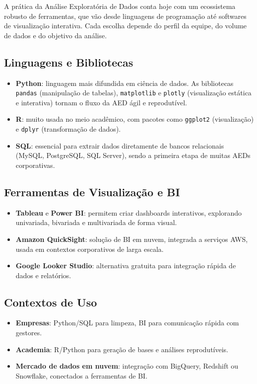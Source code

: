 A prática da Análise Exploratória de Dados conta hoje com um ecossistema robusto de ferramentas, que vão desde linguagens de programação até softwares de visualização interativa. Cada escolha depende do perfil da equipe, do volume de dados e do objetivo da análise. 

\subsection*{Linguagens e Bibliotecas}
\begin{itemize}[leftmargin=*]
  \item \textbf{Python}: linguagem mais difundida em ciência de dados. As bibliotecas \texttt{pandas} (manipulação de tabelas), \texttt{matplotlib} e \texttt{plotly} (visualização estática e interativa) tornam o fluxo da AED ágil e reprodutível.
  \item \textbf{R}: muito usada no meio acadêmico, com pacotes como \texttt{ggplot2} (visualização) e \texttt{dplyr} (transformação de dados).
  \item \textbf{SQL}: essencial para extrair dados diretamente de bancos relacionais (MySQL, PostgreSQL, SQL Server), sendo a primeira etapa de muitas AEDs corporativas.
\end{itemize}

\subsection*{Ferramentas de Visualização e BI}
\begin{itemize}[leftmargin=*]
  \item \textbf{Tableau} e \textbf{Power BI}: permitem criar dashboards interativos, explorando univariada, bivariada e multivariada de forma visual.
  \item \textbf{Amazon QuickSight}: solução de BI em nuvem, integrada a serviços AWS, usada em contextos corporativos de larga escala.
  \item \textbf{Google Looker Studio}: alternativa gratuita para integração rápida de dados e relatórios.
\end{itemize}

\subsection*{Contextos de Uso}
\begin{itemize}[leftmargin=*]
  \item \textbf{Empresas}: Python/SQL para limpeza, BI para comunicação rápida com gestores.
  \item \textbf{Academia}: R/Python para geração de bases e análises reprodutíveis.
  \item \textbf{Mercado de dados em nuvem}: integração com BigQuery, Redshift ou Snowflake, conectados a ferramentas de BI.
\end{itemize}

